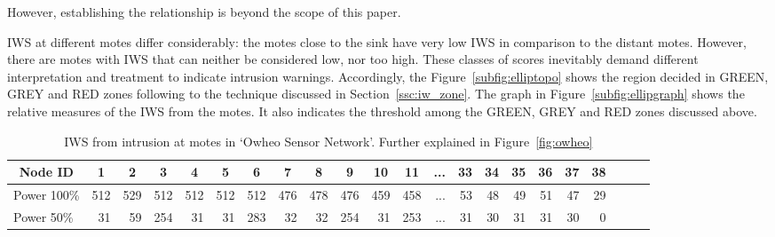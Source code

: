 \documentclass[conference]{IEEEtran}
\newcommand*{\bd}[1]{\multicolumn{1}{|c|}{\bfseries #1}}
\begin{document}
However, establishing the relationship is beyond the scope of this paper.

IWS at different motes differ considerably: the motes close to the sink have very low IWS in comparison to the distant motes.
However, there are motes with IWS that can neither be considered low, nor too high.
These classes of scores inevitably demand different interpretation and treatment to indicate intrusion warnings. 
Accordingly, the Figure~\ref{subfig:elliptopo}  shows the region decided in GREEN, GREY and RED zones following to the technique discussed in Section~\ref{ssc:iw_zone}.
The graph in  Figure~\ref{subfig:ellipgraph} shows the relative measures of the IWS from the motes.
It also indicates the threshold among the GREEN, GREY and RED zones discussed above.



\begin{table}[t!]
\centering
\begin{tabular}{|l|*{20}{r|}r|}
\hline
\bd{Node ID}           & \bd{1} & \bd{2} & \bd{3} & \bd{4} & \bd{5} & \bd{6} & \bd{7} & \bd{8} & \bd{9} & \bd{10} & \bd{11} & \bd{...} & \bd{33} & \bd{34} & \bd{35} & \bd{36} & \bd{37} & \bd{38} \\
\hline		\hline

Power 100\%	   & 512 & 529 & 512 & 512 & 512  & 512 & 476 & 478 & 476 & 459 & 458 & ...& 53  & 48 & 49 & 51 & 47 & 29 \\
\hline

Power 50\%	  &31 & 59&254& 31& 31 &283& 32& 32& 254& 31 &253 & ... & 31  & 30 & 31 & 31 & 30 & 0 \\
\hline
\end{tabular}
\caption{IWS from intrusion at motes in `Owheo Sensor Network'. Further explained in Figure~\ref{fig:owheo}}
\label{tab:owheo}
\end{table}
\end{document}
